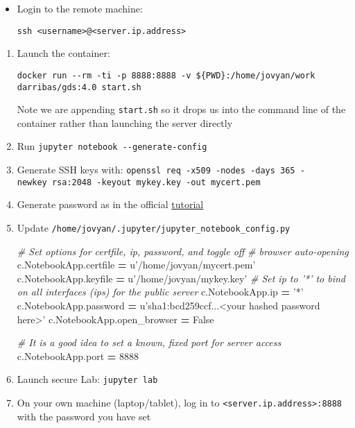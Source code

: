 \documentclass[]{book}
\newenvironment{Shaded}{\begin{snugshade}}{\end{snugshade}}
\newcommand{\DecValTok}[1]{\textcolor[rgb]{0.00,0.00,0.81}{#1}}
\newcommand{\StringTok}[1]{\textcolor[rgb]{0.31,0.60,0.02}{#1}}
\newcommand{\CommentTok}[1]{\textcolor[rgb]{0.56,0.35,0.01}{\textit{#1}}}
\newcommand{\VariableTok}[1]{\textcolor[rgb]{0.00,0.00,0.00}{#1}}
\newcommand{\OperatorTok}[1]{\textcolor[rgb]{0.81,0.36,0.00}{\textbf{#1}}}
\newcommand{\NormalTok}[1]{#1}
\begin{document}
\begin{itemize}
\item
  Login to the remote machine:

\begin{verbatim}
ssh <username>@<server.ip.address>
\end{verbatim}
\end{itemize}

\begin{enumerate}
\def\labelenumi{\arabic{enumi}.}
\item
  Launch the container:

\begin{verbatim}
docker run --rm -ti -p 8888:8888 -v ${PWD}:/home/jovyan/work darribas/gds:4.0 start.sh
\end{verbatim}

  Note we are appending \texttt{start.sh} so it drops us into the
  command line of the container rather than launching the server
  directly
\item
  Run \texttt{jupyter\ notebook\ -\/-generate-config}
\item
  Generate SSH keys with:
  \texttt{openssl\ req\ -x509\ -nodes\ -days\ 365\ -newkey\ rsa:2048\ -keyout\ mykey.key\ -out\ mycert.pem}
\item
  Generate password as in the official
  \href{http://jupyter-notebook.readthedocs.io/en/stable/public_server.html\#preparing-a-hashed-password}{tutorial}
\item
  Update \texttt{/home/jovyan/.jupyter/jupyter\_notebook\_config.py}

\begin{Shaded}
\begin{Highlighting}[]
\CommentTok{# Set options for certfile, ip, password, and toggle off}
\CommentTok{# browser auto-opening}
\NormalTok{c.NotebookApp.certfile }\OperatorTok{=} \StringTok{u'/home/jovyan/mycert.pem'}
\NormalTok{c.NotebookApp.keyfile }\OperatorTok{=} \StringTok{u'/home/jovyan/mykey.key'}
\CommentTok{# Set ip to '*' to bind on all interfaces (ips) for the public server}
\NormalTok{c.NotebookApp.ip }\OperatorTok{=} \StringTok{'*'}
\NormalTok{c.NotebookApp.password }\OperatorTok{=} \StringTok{u'sha1:bcd259ccf...<your hashed password here>'}
\NormalTok{c.NotebookApp.open_browser }\OperatorTok{=} \VariableTok{False}

\CommentTok{# It is a good idea to set a known, fixed port for server access}
\NormalTok{c.NotebookApp.port }\OperatorTok{=} \DecValTok{8888}
\end{Highlighting}
\end{Shaded}
\item
  Launch secure Lab: \texttt{jupyter\ lab}
\item
  On your own machine (laptop/tablet), log in to
  \texttt{\textless{}server.ip.address\textgreater{}:8888} with the
  password you have set
\end{enumerate}
\end{document}

